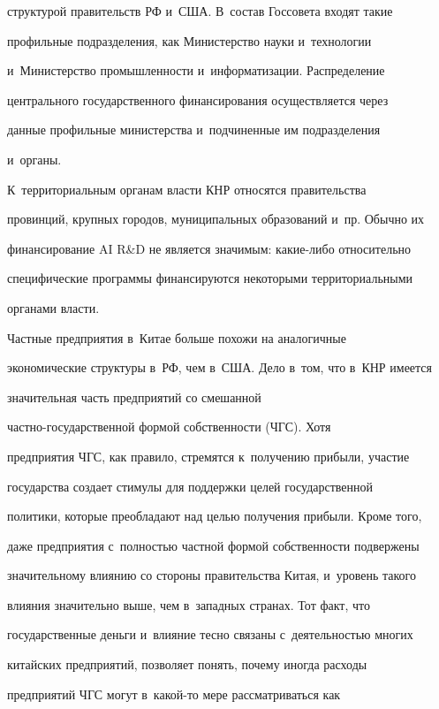 структурой правительств РФ и~США. В~состав Госсовета входят такие 


профильные подразделения, как Министерство науки и~технологии 


и~Министерство промышленности и~информатизации. Распределение 


центрального государственного финансирования осуществляется через 


данные профильные министерства и~подчиненные им подразделения 


и~органы.


     


     К~территориальным органам власти КНР относятся правительства 


провинций, крупных городов, муниципальных образований и~пр. Обычно их 


финансирование AI R\&D не является значимым: ка\-кие-ли\-бо относительно 


специфические программы финансируются некоторыми территориальными 


органами власти.


     


     Частные предприятия в~Китае больше похожи на аналогичные 


экономические структуры в~РФ, чем в~США. Дело в~том, что в~КНР имеется 


значительная часть предприятий со смешанной  


част\-но-го\-су\-дар\-ст\-вен\-ной формой собственности (ЧГС). Хотя 


предприятия ЧГС, как правило, стремятся к~получению прибыли, участие 


государства создает стимулы для поддержки целей государственной 


политики, которые преобладают над целью получения прибыли. Кроме того, 


даже предприятия с~полностью част\-ной формой соб\-ст\-вен\-ности подвержены 


значительному влиянию со стороны правительства Китая, и~уровень такого 


влияния значительно выше, чем в~западных странах. Тот факт, что 


государственные деньги и~влияние тес\-но связаны с~деятельностью многих 


китайских предприятий, позволяет понять, почему иногда расходы 


предприятий ЧГС могут в~ка\-кой-то мере рас\-смат\-ри\-вать\-ся как 



